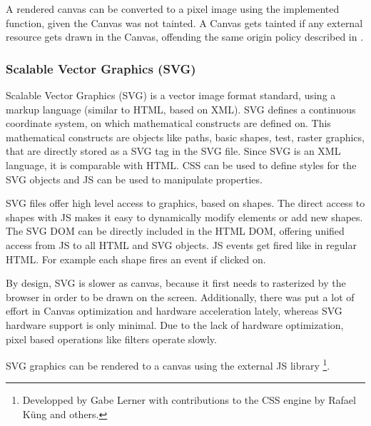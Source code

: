 A rendered canvas can be converted to a pixel image using the implemented  function, given the Canvas was not tainted.
A Canvas gets tainted if any external resource gets drawn in the Canvas, offending the same origin policy described in .

\subsubsection{Scalable Vector Graphics (SVG)}
\label{sec:svg}

Scalable Vector Graphics (SVG) is a vector image format standard, using a markup language (similar to HTML, based on XML).
SVG defines a continuous coordinate system, on which mathematical constructs are defined on.
This mathematical constructs are objects like paths, basic shapes, test, raster graphics, that are directly stored as a SVG tag in the SVG file.
Since SVG is an XML language, it is comparable with HTML.
CSS can be used to define styles for the SVG objects and JS can be used to manipulate properties.

SVG files offer high level access to graphics, based on shapes.
The direct access to shapes with JS makes it easy to dynamically modify elements or add new shapes.
The SVG DOM can be directly included in the HTML DOM, offering unified access from JS to all HTML and SVG objects.
JS events get fired like in regular HTML.
For example each shape fires an  event if clicked on.


By design, SVG is slower as canvas, because it first needs to rasterized by the browser in order to be drawn on the screen.
Additionally, there was put a lot of effort in Canvas optimization and hardware acceleration lately, whereas SVG hardware support is only minimal.
Due to the lack of hardware optimization, pixel based operations like filters operate slowly.

SVG graphics can be rendered to a canvas using the external JS library \footnote{Developped by Gabe Lerner with contributions to the CSS engine by Rafael Küng and others.}.




